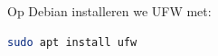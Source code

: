 Op Debian installeren we UFW met:
\begin{lstlisting}[language=bash]
sudo apt install ufw
\end{lstlisting}

